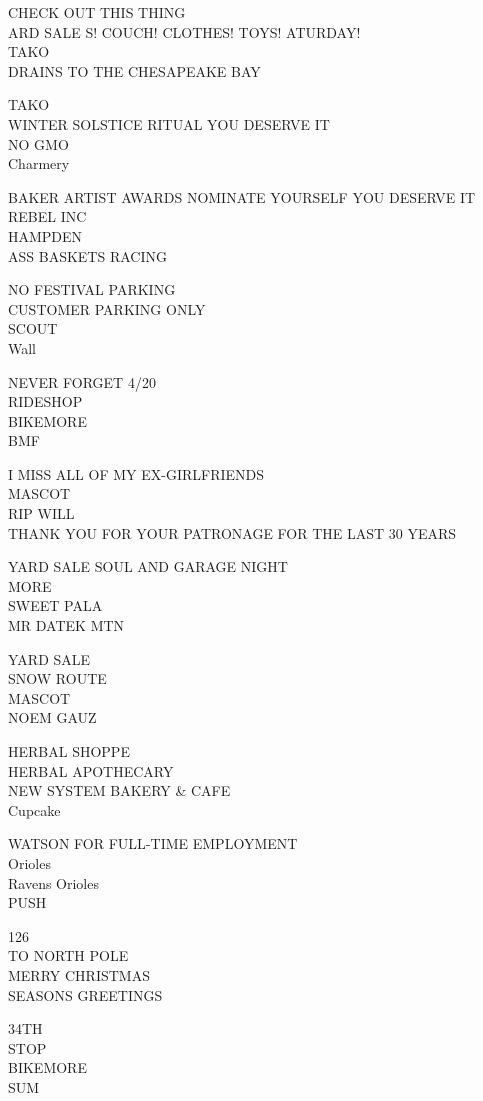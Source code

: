 \documentclass[10pt,letterpaper]{article}
\begin{document}
CHECK OUT THIS THING\\
ARD SALE S! COUCH! CLOTHES! TOYS! ATURDAY!\\
TAKO\\
DRAINS TO THE CHESAPEAKE BAY

TAKO\\
WINTER SOLSTICE RITUAL YOU DESERVE IT\\
NO GMO\\
Charmery

BAKER ARTIST AWARDS NOMINATE YOURSELF YOU DESERVE IT\\
REBEL INC\\
HAMPDEN\\
ASS BASKETS RACING

NO FESTIVAL PARKING\\
CUSTOMER PARKING ONLY\\
SCOUT\\
Wall

NEVER FORGET 4/20\\
RIDESHOP\\
BIKEMORE\\
BMF

I MISS ALL OF MY EX{-}GIRLFRIENDS\\
MASCOT\\
RIP WILL\\
THANK YOU FOR YOUR PATRONAGE FOR THE LAST 30 YEARS

YARD SALE SOUL AND GARAGE NIGHT\\
MORE\\
SWEET PALA\\
MR DATEK MTN

YARD SALE\\
SNOW ROUTE\\
MASCOT\\
NOEM GAUZ

HERBAL SHOPPE\\
HERBAL APOTHECARY\\
NEW SYSTEM BAKERY \& CAFE\\
Cupcake

WATSON FOR FULL{-}TIME EMPLOYMENT\\
Orioles\\
Ravens Orioles\\
PUSH

126\\
TO NORTH POLE\\
MERRY CHRISTMAS\\
SEASONS GREETINGS

34TH\\
STOP\\
BIKEMORE\\
SUM
\end{document}
